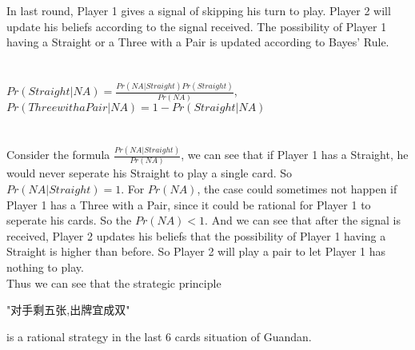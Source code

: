 \documentclass{article}
\begin{document}
In last round, Player 1 gives a signal of skipping his turn to play. Player 2 will update his beliefs according to the signal received. The possibility of Player 1 having a Straight or a Three with a Pair is updated according to Bayes' Rule.\\
\\ \hspace*{\fill} \\
$
    Pr(Straight|NA) = \frac{Pr(NA|Straight)Pr(Straight)}{Pr(NA)}
$, \\
$
    Pr(Three with a Pair|NA) = 1 - Pr(Straight|NA)
$\\
\\ \hspace*{\fill} \\
Consider the formula $\frac{Pr(NA|Straight)}{Pr(NA)}$, we can see that if Player 1 has a Straight, he would never seperate his Straight to play a single card. So $Pr(NA|Straight) = 1$. For $Pr(NA)$, the case could sometimes not happen if Player 1 has a Three with a Pair, since it could be rational for Player 1 to seperate his cards. So the $ Pr(NA) < 1$.
And we can see that after the signal is received, Player 2 updates his beliefs that the possibility of Player 1 having a Straight is higher than before. So Player 2 will play a pair to let Player 1 has nothing to play.\\
Thus we can see that the strategic principle
\begin{CJK*}{UTF8}{gbsn}"对手剩五张,出牌宜成双" \end{CJK*}
is a rational strategy in the last 6 cards situation of Guandan.\\
\end{document}

